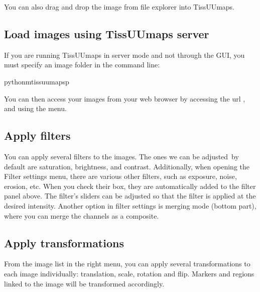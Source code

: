 \documentclass[letterpaper,10pt,english,openany,oneside]{sphinxmanual}
\begin{document}
\sphinxAtStartPar
You can also drag and drop the image from file explorer into TissUUmaps.


\subsection{Load images using TissUUmaps server}
\label{\detokenize{docs/starting/images:load-images-using-tissuumaps-server}}
\sphinxAtStartPar
If you are running TissUUmaps in server mode and not through the GUI, you must specify an image folder in the command line:

\begin{sphinxVerbatim}[commandchars=\\\{\}]
python\PYGZhy{}mtissuumaps\PYGZhy{}p
\end{sphinxVerbatim}

\sphinxAtStartPar
You can then access your images from your web browser by accessing the url , and using the  menu.

\sphinxAtStartPar
{}

\sphinxAtStartPar
{}


\subsection{Apply filters}
\label{\detokenize{docs/starting/images:apply-filters}}
\sphinxAtStartPar
You can apply several filters to the images. The ones we can be adjusted by default are saturation, brightness, and contrast. Additionally, when opening the Filter settings menu, there are various other filters, such as exposure, noise, erosion, etc. When you check their box, they are automatically added to the filter panel above. The filter’s sliders can be adjusted so that the filter is applied at the desired intensity. Another option in filter settings is merging mode (bottom part), where you can merge the channels as a composite.

\sphinxAtStartPar
{}


\subsection{Apply transformations}
\label{\detokenize{docs/starting/images:apply-transformations}}
\sphinxAtStartPar
From the image list in the right menu, you can apply several transformations to each image individually: translation, scale, rotation and flip. Markers and regions linked to the image will be transformed accordingly.
\end{document}
